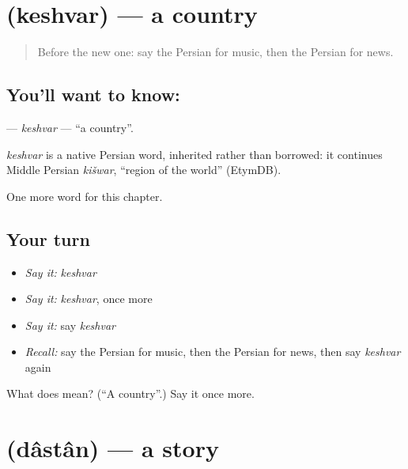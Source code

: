 \section[\texorpdfstring{\fa{کشور} (keshvar)}{کشور (keshvar)}]{ (keshvar) — a country}

\label{lesson:FA-C78-keshvar}



\begin{quote}
Before the new one: say the Persian for music, then the Persian for news.
\end{quote}

\subsection*{You'll want to know: }
\textbf{} — \emph{keshvar} — \textquotedblleft{}a country\textquotedblright{}.

\begin{cousinweb}
\emph{keshvar} is a native Persian word, inherited rather than borrowed: it continues Middle Persian \emph{kišwar}, \textquotedblleft{}region of the world\textquotedblright{} (EtymDB).
\end{cousinweb}

\begin{grammarlens}[title={What you've built}]
One more word for this chapter.
\end{grammarlens}

\subsection*{Your turn}
\begin{itemize}
\raggedright
  \item \emph{Say it:} \emph{keshvar}
  \item \emph{Say it:} \emph{keshvar}, once more
  \item \emph{Say it:} say \emph{keshvar}
  \item \emph{Recall:} say the Persian for music, then the Persian for news, then say \emph{keshvar} again
\end{itemize}

\begin{tcolorbox}[breakable,colback=teal!4,colframe=teal!35!black,title={Before you move on}]
What does  mean? (\textquotedblleft{}A country\textquotedblright{}.) Say it once more.
\end{tcolorbox}
\section[\texorpdfstring{\fa{داستان} (dâstân)}{داستان (dâstân)}]{ (dâstân) — a story}

